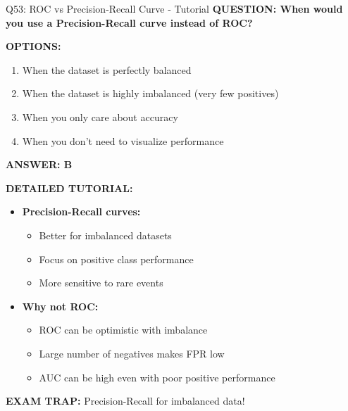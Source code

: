 \documentclass[8pt]{beamer}
\begin{document}
	\begin{frame}{Q53: ROC vs Precision-Recall Curve - Tutorial}
		\fontsize{6.5}{7.5}\selectfont
		\textbf{QUESTION: When would you use a Precision-Recall curve instead of ROC?}
		
		\vspace{0.1cm}
		\textbf{OPTIONS:}
		\begin{enumerate}
			\item When the dataset is perfectly balanced
			\item When the dataset is highly imbalanced (very few positives)
			\item When you only care about accuracy
			\item When you don't need to visualize performance
		\end{enumerate}
		
		\vspace{0.1cm}
		\textcolor{myblue}{\textbf{ANSWER: B}}
		
		\vspace{0.1cm}
		\textbf{DETAILED TUTORIAL:}
		\begin{itemize}
			\item \textbf{Precision-Recall curves:}
			\begin{itemize}
				\item Better for imbalanced datasets
				\item Focus on positive class performance
				\item More sensitive to rare events
			\end{itemize}
			\item \textbf{Why not ROC:}
			\begin{itemize}
				\item ROC can be optimistic with imbalance
				\item Large number of negatives makes FPR low
				\item AUC can be high even with poor positive performance
			\end{itemize}
		\end{itemize}
		
		\textcolor{myred}{\textbf{EXAM TRAP:}} Precision-Recall for \textcolor{myblue}{imbalanced data}!
	\end{frame}
	
\end{document}
